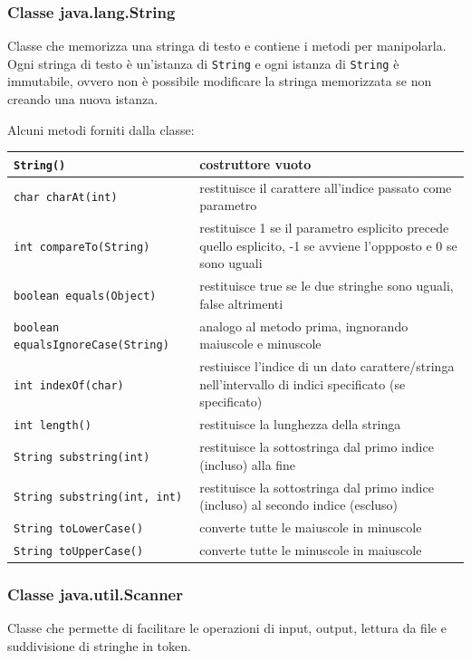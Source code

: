 \documentclass{article}
\begin{document}
\newpage


\subsubsection*{Classe java.lang.String}
Classe che memorizza una stringa di testo e contiene i metodi per manipolarla. Ogni stringa di testo è un'istanza di \verb|String| e ogni istanza di
\verb|String| è immutabile, ovvero non è possibile modificare la stringa memorizzata se non creando una nuova istanza.

Alcuni metodi forniti dalla classe:
\begin{center}
	\begin{tabularx}{\textwidth}{l X}
		\toprule
		\verb|String()| & costruttore vuoto \\
		\midrule
		\verb|char charAt(int)| & restituisce il carattere all'indice passato come parametro \\
		\midrule
		\verb|int compareTo(String)| & restituisce 1 se il parametro esplicito precede quello esplicito, -1 se avviene l'oppposto e 0 se sono uguali \\
		\midrule
		\verb|boolean equals(Object)| & restituisce true se le due stringhe sono uguali, false altrimenti \\
		\midrule
		\verb|boolean equalsIgnoreCase(String)| & analogo al metodo prima, ingnorando maiuscole e minuscole \\
		\midrule
		\verb|int indexOf(char)| & restiuisce l'indice di un dato carattere/stringa nell'intervallo di indici specificato (se specificato) \\
		\midrule
		\verb|int length()| & restituisce la lunghezza della stringa \\
		\midrule
		\verb|String substring(int)| & restituisce la sottostringa dal primo indice (incluso) alla fine \\
		\midrule
		\verb|String substring(int, int)| & restituisce la sottostringa dal primo indice (incluso) al secondo indice (escluso) \\
		\midrule
		\verb|String toLowerCase()| & converte tutte le maiuscole in minuscole \\
		\midrule
		\verb|String toUpperCase()| & converte tutte le minuscole in maiuscole \\
		\bottomrule
	\end{tabularx}
\end{center}

\subsubsection*{Classe java.util.Scanner}
Classe che permette di facilitare le operazioni di input, output, lettura da file e suddivisione di stringhe in token.
\end{document}
